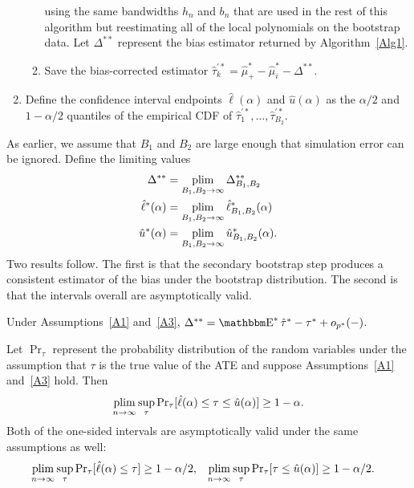 \documentclass[12pt,fleqn]{article}
\begin{document}
\begin{algorithm}
\begin{enumerate}
\begin{enumerate}
\begin{equation*}
      \end{equation*}
      using the same bandwidths $h_n$ and $b_n$ that are used in the rest of
      this algorithm but reestimating all of the local polynomials on the
      bootstrap data. Let $\Delta^{**}$ represent the bias estimator returned
      by Algorithm~\ref{Alg1}.
    \item Save the bias-corrected estimator
      $\hat\tau_k^{\prime*} = \hat\mu_+^* - \hat\mu_i^* - \Delta^{**}$.
    \end{enumerate}
  \item Define the confidence interval endpoints $\hat\ell(\alpha)$ and
    $\hat u(\alpha)$ as the $\alpha/2$ and $1-\alpha/2$ quantiles of the
    empirical CDF of $\hat\tau_1^{\prime*},\dots,\hat\tau_{B_2}^{\prime*}$.
  \end{enumerate}
\end{algorithm}

As earlier, we assume that $B_1$ and $B_2$ are large enough that simulation
error can be ignored. Define the limiting values
\begin{align*}
\Delta^{**} &= \operatorname*{plim}_{B_1,B_2 \to \infty} \Delta^{**}_{B_1,B_2} \\
\hat\ell^*(\alpha) &= \operatorname*{plim}_{B_1,B_2 \to \infty} \hat\ell^*_{B_1,B_2}(\alpha) \\
\hat u^*(\alpha) &= \operatorname*{plim}_{B_1,B_2 \to \infty} \hat u^*_{B_1,B_2}(\alpha).
\end{align*}
Two results follow. The first is that the secondary bootstrap step produces
a consistent estimator of the bias under the bootstrap distribution. The
second is that the intervals overall are asymptotically valid.

\begin{lemma}\label{L2}
  Under Assumptions~\ref{A1} and~\ref{A3},
  $\Delta^{**} = \E^* \hat\tau^* - \tau^* + o_{p^*}(-)$.
\end{lemma}


\begin{theorem}\label{T2}
  Let $\Pr_\tau$ represent the probability distribution of the random variables
  under the assumption that $\tau$ is the true value of the ATE and suppose
  Assumptions~\ref{A1} and~\ref{A3} hold. Then
  \begin{equation}
    \label{eq:5}
    \operatorname*{plim}_{n \to \infty} \sup_\tau
    \operatorname{Pr}_\tau[\hat\ell(\alpha) \leq \tau \leq \hat u(\alpha)] \geq 1 - \alpha.
  \end{equation}
  Both of the one-sided intervals are asymptotically valid under the same
  assumptions as well:
  \begin{align}
    \operatorname*{plim}_{n \to \infty} \sup_\tau
    \operatorname{Pr}_\tau[\hat\ell(\alpha) \leq \tau ] &\geq 1 - \alpha / 2, &
    \operatorname*{plim}_{n \to \infty} \sup_\tau
    \operatorname{Pr}_\tau[\tau \leq \hat u(\alpha)] &\geq 1 - \alpha / 2.
  \end{align}
\end{theorem}
\end{document}
